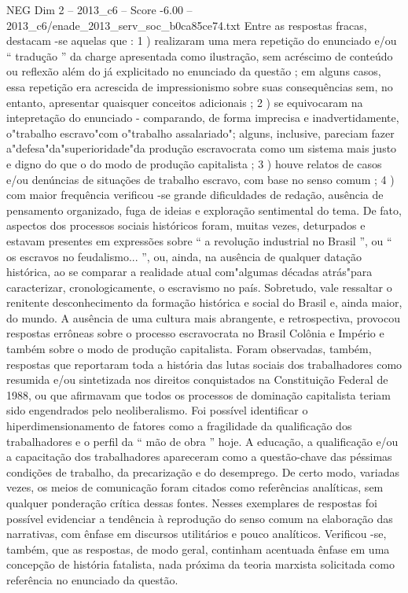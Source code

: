 \begin{textsample}{NEG Dim 2 – 2013\_c6 – Score -6.00 – 2013\_c6/enade\_2013\_serv\_soc\_b0ca85ce74.txt}
Entre as respostas fracas, destacam -se aquelas que : 1 ) realizaram uma mera repetição do enunciado e/ou “ tradução ” da charge apresentada como ilustração, sem acréscimo de conteúdo ou reflexão além do já explicitado no enunciado da questão ; em alguns casos, essa repetição era acrescida de impressionismo sobre suas consequências sem, no entanto, apresentar quaisquer conceitos adicionais ; 2 ) se equivocaram na intepretação do enunciado - comparando, de forma imprecisa e inadvertidamente, o"trabalho escravo"com o"trabalho assalariado"; alguns, inclusive, pareciam fazer a"defesa"da"superioridade"da produção escravocrata como um sistema mais justo e digno do que o do modo de produção capitalista ; 3 ) houve relatos de casos e/ou denúncias de situações de trabalho escravo, com base no senso comum ; 4 ) com maior frequência verificou -se grande dificuldades de redação, ausência de pensamento organizado, fuga de ideias e exploração sentimental do tema.
De fato, aspectos dos processos sociais históricos foram, muitas vezes, deturpados e estavam presentes em expressões sobre “ a revolução industrial no Brasil ”, ou “ os escravos no feudalismo... ”, ou, ainda, na ausência de qualquer datação histórica, ao se comparar a realidade atual com"algumas décadas atrás"para caracterizar, cronologicamente, o escravismo no país.
Sobretudo, vale ressaltar o renitente desconhecimento da formação histórica e social do Brasil e, ainda maior, do mundo.
A ausência de uma cultura mais abrangente, e retrospectiva, provocou respostas errôneas sobre o processo escravocrata no Brasil Colônia e Império e também sobre o modo de produção capitalista.
Foram observadas, também, respostas que reportaram toda a história das lutas sociais dos trabalhadores como resumida e/ou sintetizada nos direitos conquistados na Constituição Federal de 1988, ou que afirmavam que todos os processos de dominação capitalista teriam sido engendrados pelo neoliberalismo.
Foi possível identificar o hiperdimensionamento de fatores como a fragilidade da qualificação dos trabalhadores e o perfil da “ mão de obra ” hoje.
A educação, a qualificação e/ou a capacitação dos trabalhadores apareceram como a questão-chave das péssimas condições de trabalho, da precarização e do desemprego.
De certo modo, variadas vezes, os meios de comunicação foram citados como referências analíticas, sem qualquer ponderação crítica dessas fontes.
Nesses exemplares de respostas foi possível evidenciar a tendência à reprodução do senso comum na elaboração das narrativas, com ênfase em discursos utilitários e pouco analíticos.
Verificou -se, também, que as respostas, de modo geral, continham acentuada ênfase em uma concepção de história fatalista, nada próxima da teoria marxista solicitada como referência no enunciado da questão.

\end{textsample}
